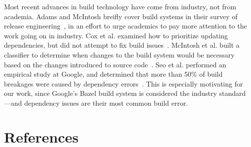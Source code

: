 \documentclass[10pt,conference]{IEEEtran}
\begin{document}
Most recent advances in build technology have come from industry, not from
academia. Adams and McIntosh breifly cover build systems in their survey of
release engineering~\cite{adams2016modern}, in an effort to urge academics to
pay more attention to the work going on in industry. Cox et al. examined how
to prioritize updating dependencies, but did not attempt to fix build issues~\cite{cox2015measuring}.
McIntosh et al. built a classifier to determine when changes to the build
system would be necessary based on the changes introduced to source code~\cite{mcintosh2014mining}.
Seo et al. performed an empirical study at Google, and determined that more
than 50\% of build breakages were caused by dependency errors~\cite{googlebuilderrors}.
This is especially motivating for our work, since Google's Bazel build system
is considered the industry standard---and dependency issues are their most
common build error.

\section{References}

\begingroup
\renewcommand{\section}[2]{}%



%
%
\endgroup
\end{document}
